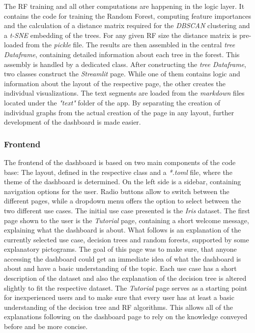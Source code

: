 \documentclass[a4paper, 12pt]{article}
\begin{document}
The RF training and all other computations are happening in the logic layer. It
contains the code for training the Random Forest, computing feature importances and the calculation
of a distance matrix required for the \textit{DBSCAN} clustering and a\textit{ t-SNE} embedding
of the trees. For any given RF size the distance matrix is pre-loaded from the
\textit{pickle} file. The results are then assembled in the central \textit{tree Dataframe}, containing
detailed information about each tree in the forest. This assembly is handled by a dedicated class.
After constructing the \textit{tree Dataframe}, two classes construct the \textit{Streamlit} page.
While one of them contains logic and information about the layout of the respective page, the other
creates the individual visualizations. The text segments are loaded from the \textit{markdown} files
located under the \textit{"text"} folder of the app. By separating the creation of individual graphs
from the actual creation of the page in any layout, further development of the dashboard is made
easier.

\subsubsection{Frontend}
The frontend of the dashboard is based on two main components of the code base: The layout, defined
in the respective class and a \textit{*.toml} file, where the theme of the dashboard is determined.
On the left side is a sidebar, containing navigation options for the user. Radio buttons allow to
switch between the different pages, while a dropdown menu offers the option to select between the
two different use cases. The initial use case presented is the \textit{Iris} dataset.
The first page shown to the user is the \textit{Tutorial} page, containing a short welcome message,
explaining what the dashboard is about. What follows is an explanation of the currently selected use
case, decision trees and random forests, supported by some explanatory pictograms.
The goal of this page was to make sure, that anyone accessing the dashboard could get an immediate
idea of what the dashboard is about and have a basic understanding of the topic. Each use case has
a short description of the dataset and also the explanation of the decision tree is altered slightly
to fit the respective dataset. The \textit{Tutorial} page serves as a starting point for
inexperienced users and to make sure that every user has at least a basic understanding of the
decision tree and RF algorithms. This allows all of the explanations following on the dashboard page
to rely on the knowledge conveyed before and be more concise. \par
\end{document}
